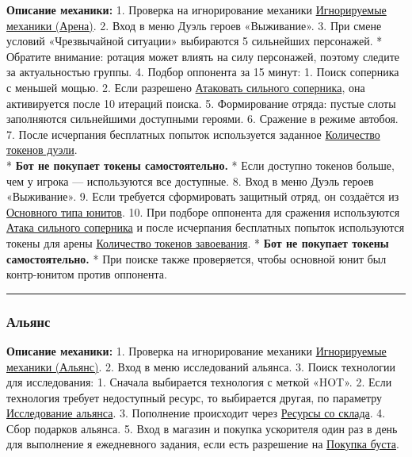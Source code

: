 \documentclass[
]{article}
\begin{document}
\textbf{Описание механики:} 1. Проверка на игнорирование механики
\hyperref[ignor_states]{Игнорируемые механики (Арена)}. 2. Вход в меню
Дуэль героев «Выживание». 3. При смене условий «Чрезвычайной ситуации»
выбираются 5 сильнейших персонажей. * Обратите внимание: ротация может
влиять на силу персонажей, поэтому следите за актуальностью группы. 4.
Подбор оппонента за 15 минут: 1. Поиск соперника с меньшей мощью. 2.
Если разрешено \hyperref[over_power_arena_fight]{Атаковать сильного
соперника}, она активируется после 10 итераций поиска. 5. Формирование
отряда: пустые слоты заполняются сильнейшими доступными героями. 6.
Сражение в режиме автобоя. 7. После исчерпания бесплатных попыток
используется заданное \hyperref[arena_tokens]{Количество токенов
дуэли}.\\
* \textbf{{Бот не покупает токены самостоятельно.}} * Если доступно
токенов больше, чем у игрока — используются все доступные. 8. Вход в
меню Дуэль героев «Выживание». 9. Если требуется сформировать защитный
отряд, он создаётся из \hyperref[unit_type]{Основного типа юнитов}. 10.
При подборе оппонента для сражения используются
\hyperref[over_power_arena_fight]{Атака сильного соперника} и после
исчерпания бесплатных попыток используются токены для арены
\hyperref[arena_tokens_conquest]{Количество токенов завоевания}. *
\textbf{{Бот не покупает токены самостоятельно.}} * При поиске также
проверяется, чтобы основной юнит был контр-юнитом против оппонента.

\begin{center}\rule{0.5\linewidth}{0.5pt}\end{center}

\subsubsection{Альянс}\label{ux430ux43bux44cux44fux43dux441}

\textbf{Описание механики:} 1. Проверка на игнорирование механики
\hyperref[ignor_states]{Игнорируемые механики (Альянс)}. 2. Вход в меню
исследований альянса. 3. Поиск технологии для исследования: 1. Сначала
выбирается технология с меткой «HOT». 2. Если технология требует
недоступный ресурс, то выбирается другая, по параметру
\hyperref[alliance_res]{Исследование альянса}. 3. Пополнение происходит
через \hyperref[store_permit]{Ресурсы со склада}. 4. Сбор подарков
альянса. 5. Вход в магазин и покупка ускорителя один раз в день для
выполнение я ежедневного задания, если есть разрешение на
\hyperref[boost_for_buy]{Покупка буста}.
\end{document}
